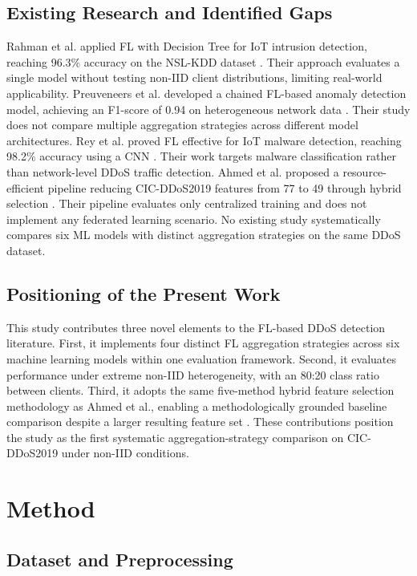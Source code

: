 \documentclass[conference, a4paper]{IEEEtran}
\begin{document}
\subsection{Existing Research and Identified Gaps}

Rahman et al. applied FL with Decision Tree for IoT intrusion detection, reaching 96.3\% accuracy on the NSL-KDD dataset \cite{b7}. Their approach evaluates a single model without testing non-IID client distributions, limiting real-world applicability. Preuveneers et al. developed a chained FL-based anomaly detection model, achieving an F1-score of 0.94 on heterogeneous network data \cite{b8}. Their study does not compare multiple aggregation strategies across different model architectures. Rey et al. proved FL effective for IoT malware detection, reaching 98.2\% accuracy using a CNN \cite{b9}. Their work targets malware classification rather than network-level DDoS traffic detection. Ahmed et al. proposed a resource-efficient pipeline reducing CIC-DDoS2019 features from 77 to 49 through hybrid selection \cite{b10}. Their pipeline evaluates only centralized training and does not implement any federated learning scenario. No existing study systematically compares six ML models with distinct aggregation strategies on the same DDoS dataset.

\subsection{Positioning of the Present Work}

This study contributes three novel elements to the FL-based DDoS detection literature. First, it implements four distinct FL aggregation strategies across six machine learning models within one evaluation framework. Second, it evaluates performance under extreme non-IID heterogeneity, with an 80:20 class ratio between clients. Third, it adopts the same five-method hybrid feature selection methodology as Ahmed et al., enabling a methodologically grounded baseline comparison despite a larger resulting feature set \cite{b10}. These contributions position the study as the first systematic aggregation-strategy comparison on CIC-DDoS2019 under non-IID conditions.

\section{Method}

\subsection{Dataset and Preprocessing}
\end{document}
